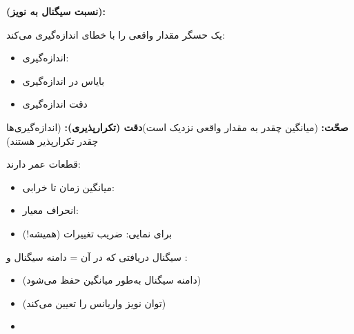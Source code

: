 \textbf{ (نسبت سیگنال به نویز):}


یک حسگر مقدار واقعی \lr{$\theta$} را با خطای  اندازه‌گیری می‌کند:

\begin{itemize}
\tightlist
\item
  اندازه‌گیری: 
\item
    بایاس در اندازه‌گیری
\item
    دقت اندازه‌گیری
\end{itemize}

\textbf{صحّت:}  (میانگین چقدر به مقدار واقعی نزدیک است)\PSbr{}\textbf{دقت (تکرارپذیری):}  (اندازه‌گیری‌ها چقدر تکرارپذیر هستند)


قطعات عمر  دارند:

\begin{itemize}
\tightlist
\item
  میانگین زمان تا خرابی: 
\item
  انحراف معیار: 
\item
  برای نمایی: ضریب تغییرات  (همیشه!)
\end{itemize}


سیگنال دریافتی  که در آن  = دامنه سیگنال و :

\begin{itemize}
\tightlist
\item
   (دامنه سیگنال به‌طور میانگین حفظ می‌شود)
\item
   (توان نویز واریانس را تعیین می‌کند)
\item
\end{itemize}


